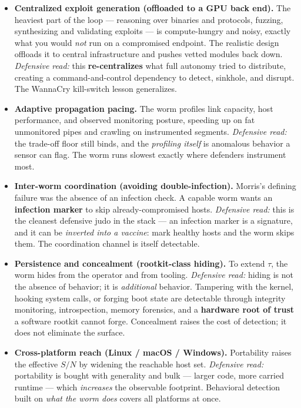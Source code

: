 \documentclass[11pt,a4paper]{article}
\begin{document}
\begin{itemize}[nosep]
  \item \textbf{Centralized exploit generation (offloaded to a GPU back end).} The heaviest part of the loop --- reasoning over binaries and protocols, fuzzing, synthesizing and validating exploits --- is compute-hungry and noisy, exactly what you would \emph{not} run on a compromised endpoint. The realistic design offloads it to central infrastructure and pushes vetted modules back down. \emph{Defensive read:} this \textbf{re-centralizes} what full autonomy tried to distribute, creating a command-and-control dependency to detect, sinkhole, and disrupt. The WannaCry kill-switch lesson generalizes.
  \item \textbf{Adaptive propagation pacing.} The worm profiles link capacity, host performance, and observed monitoring posture, speeding up on fat unmonitored pipes and crawling on instrumented segments. \emph{Defensive read:} the trade-off floor still binds, and the \emph{profiling itself} is anomalous behavior a sensor can flag. The worm runs slowest exactly where defenders instrument most.
  \item \textbf{Inter-worm coordination (avoiding double-infection).} Morris's defining failure was the absence of an infection check. A capable worm wants an \textbf{infection marker} to skip already-compromised hosts. \emph{Defensive read:} this is the cleanest defensive judo in the stack --- an infection marker is a signature, and it can be \emph{inverted into a vaccine}: mark healthy hosts and the worm skips them. The coordination channel is itself detectable.
  \item \textbf{Persistence and concealment (rootkit-class hiding).} To extend $\tau$, the worm hides from the operator and from tooling. \emph{Defensive read:} hiding is not the absence of behavior; it is \emph{additional} behavior. Tampering with the kernel, hooking system calls, or forging boot state are detectable through integrity monitoring, introspection, memory forensics, and a \textbf{hardware root of trust} a software rootkit cannot forge. Concealment raises the cost of detection; it does not eliminate the surface.
  \item \textbf{Cross-platform reach (Linux / macOS / Windows).} Portability raises the effective $S/N$ by widening the reachable host set. \emph{Defensive read:} portability is bought with generality and bulk --- larger code, more carried runtime --- which \emph{increases} the observable footprint. Behavioral detection built on \emph{what the worm does} covers all platforms at once.
\end{itemize}
\end{document}
